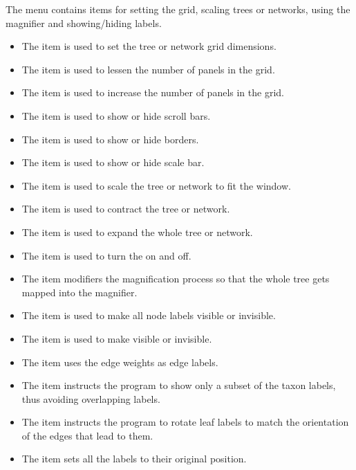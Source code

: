 \documentclass[11pt]{article}
\begin{document}
\label{views}
The  menu contains items for setting the grid, scaling trees or networks, using the magnifier and showing/hiding labels.
\begin{itemize}
\item The  item is used to set  the tree or network grid dimensions.
\item The  item is used to lessen the number of panels in the grid.
\item The  item is used to increase the number of panels in the grid.
\item The  item is used to show or hide scroll bars.
\item The  item is used to show or hide borders.
\item The  item is used to show or hide scale bar.
\item The  item is used to scale the tree or network to fit the window.
\item The  item is used to contract the tree or network.
\item The  item is used to expand the whole tree or network.
\item The  item is used to turn the
  on and off.
\item The  item modifiers the magnification process
so that the whole tree gets mapped into the magnifier.
\item The  item is used to make all node labels visible or invisible.
\item The  item is used to make  visible or invisible.
\item The  item uses the edge weights as edge labels.
\item The  item instructs the program to show only a subset of the taxon labels, thus avoiding overlapping labels.
\item The  item instructs the program to rotate leaf labels
to match the orientation of the edges that lead to them.
\item The  item sets all the labels to their original position.
\end{itemize}
\end{document}

